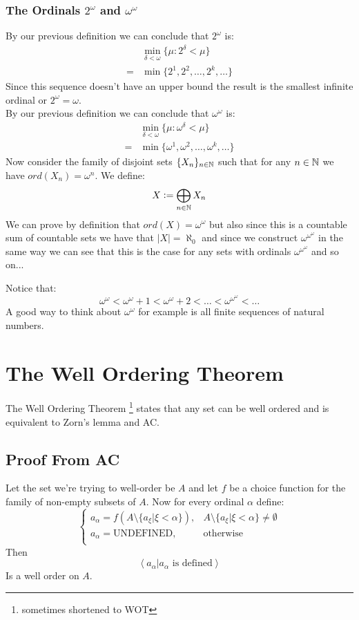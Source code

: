 \documentclass[11pt,a4paper]{article}
\begin{document}
  \subsubsection{The Ordinals \texorpdfstring{$2^\omega$}{ord} and 
  \texorpdfstring{$\omega^\omega$}{ord}}
	By our previous definition we can conclude that $2^\omega$ is:
	\begin{align*}
		&\min_{\delta<\omega}\{\mu:2^\delta<\mu\} \\
		=&\min\{2^1,2^2,\ldots,2^k,\ldots\}
	\end{align*}
	Since this sequence doesn't have an upper bound the result is the smallest 
	infinite ordinal or $2^\omega=\omega$. \\
	By our previous definition we can conclude that $\omega^\omega$ is:
	\begin{align*}
		&\min_{\delta<\omega}\{\mu:\omega^\delta<\mu\} \\
		=&\min\{\omega^1,\omega^2,\ldots,\omega^k,\ldots\}
	\end{align*}
	Now consider the family of disjoint sets $\{X_n\}_{n \in \mathbb{N}}$ such that 
	for any $n \in \mathbb{N}$ we have $ord(X_n) = \omega^n$. We define:
	\[
		X := \bigoplus_{n \in \mathbb{N}}{X_n}
	\]
	We can prove by definition that $ord(X)=\omega^\omega$ but also since 
	this is a countable sum of countable sets we have that $|X| = \aleph_0$ 
	and since we construct $\omega^{\omega^\omega}$ in the same way we
	can see that this is the case for any sets with ordinals 
	$\omega^{\omega^\omega}$ and so on...
	\begin{remark}
	Notice that:
	\[
		\omega^\omega<\omega^\omega+1<\omega^\omega+2
		<\ldots<
		\omega^{\omega^\omega}<\ldots
	\]
	A good way to think about $\omega^\omega$ for example is all finite 
	sequences of natural numbers.
	\end{remark}

\newpage
\section{The Well Ordering Theorem}
The Well Ordering Theorem
\footnote{sometimes shortened to WOT} states that any set can be well ordered 
and is equivalent to Zorn's lemma and AC.
\subsection{Proof From AC}
Let the set we're trying to well-order be $A$ and let $f$ be a choice 
function for the family of non-empty subsets of $A$. Now for every ordinal 
$\alpha$ define:
\[
	\begin{cases}
	a_\alpha = f(A\setminus\{a_\xi|\xi<\alpha\}),& A\setminus\{a_\xi|
	\xi<\alpha\}\neq\emptyset \\
	a_\alpha = \text{UNDEFINED},& \text{otherwise} \\
	\end{cases}
\]
Then
\[
	\left<a_\alpha|a_\alpha \text{ is defined}\right>
\]
Is a well order on $A$.
\end{document}
